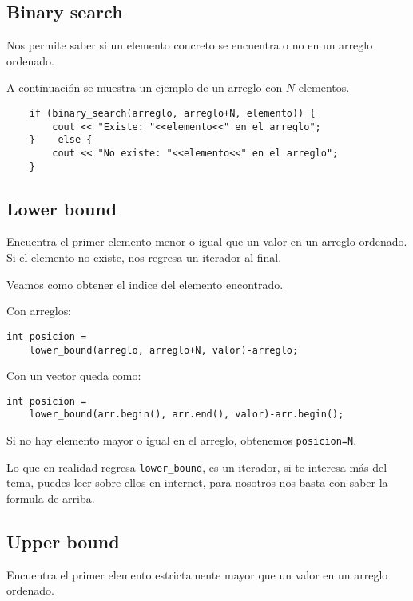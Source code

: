 \subsection*{Binary search}

Nos permite saber si un elemento concreto se encuentra o no en un arreglo ordenado.

A continuación se muestra un ejemplo de un arreglo con \(N\) elementos.
\begin{lstlisting}
	if (binary_search(arreglo, arreglo+N, elemento)) {
		cout << "Existe: "<<elemento<<" en el arreglo";	
	}	 else {
		cout << "No existe: "<<elemento<<" en el arreglo";	
	}
\end{lstlisting}

\subsection*{Lower bound}
Encuentra el primer elemento menor o igual que un valor en un arreglo ordenado. Si el elemento no existe, nos regresa un iterador al final.

Veamos como obtener el indice del elemento encontrado.

Con arreglos:
\begin{small}
\begin{lstlisting}
int posicion = 
	lower_bound(arreglo, arreglo+N, valor)-arreglo;
\end{lstlisting}
\end{small}

Con un vector queda como:

\begin{small}
\begin{lstlisting}
int posicion = 
	lower_bound(arr.begin(), arr.end(), valor)-arr.begin();
\end{lstlisting}
\end{small}

Si no hay elemento mayor o igual en el arreglo, obtenemos \verb|posicion=N|.

Lo que en realidad regresa \verb|lower_bound|, es un iterador, si te interesa más del tema, puedes leer sobre ellos en internet, para nosotros nos basta con saber la formula de arriba.

\subsection*{Upper bound}
Encuentra el primer elemento estrictamente mayor que un valor en un arreglo ordenado. 

